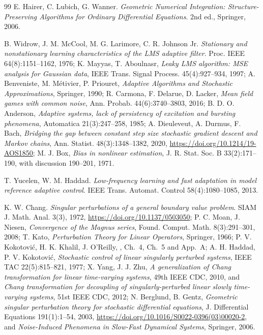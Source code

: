 \begin{thebibliography}{99}
E. Hairer, C. Lubich, G. Wanner.
\emph{Geometric Numerical Integration: Structure-Preserving Algorithms for Ordinary Differential Equations}.
2nd ed., Springer, 2006.

B. Widrow, J. M. McCool, M. G. Larimore, C. R. Johnson Jr.
\emph{Stationary and nonstationary learning characteristics of the LMS adaptive filter}.
Proc. IEEE 64(8):1151--1162, 1976;
K. Mayyas, T. Aboulnasr, \emph{Leaky LMS algorithm: MSE analysis for Gaussian data}, IEEE Trans. Signal Process.
45(4):927--934, 1997;
A. Benveniste, M. M\'etivier, P. Priouret, \emph{Adaptive Algorithms and Stochastic Approximations}, Springer, 1990;
R. Carmona, F. Delarue, D. Lacker, \emph{Mean field games with common noise}, Ann. Probab. 44(6):3740--3803, 2016;
B. D. O. Anderson, \emph{Adaptive systems, lack of persistency of excitation and bursting phenomena}, Automatica
21(3):247--258, 1985;
A. Dieuleveut, A. Durmus, F. Bach, \emph{Bridging the gap between constant step size stochastic gradient descent and
Markov chains}, Ann. Statist. 48(3):1348--1382, 2020, \url{https://doi.org/10.1214/19-AOS1850};
M. J. Box, \emph{Bias in nonlinear estimation}, J. R. Stat. Soc. B 33(2):171--190, with discussion 190--201, 1971.

T. Yucelen, W. M. Haddad.
\emph{Low-frequency learning and fast adaptation in model reference adaptive control}.
IEEE Trans. Automat. Control 58(4):1080--1085, 2013.

K. W. Chang.
\emph{Singular perturbations of a general boundary value problem}.
SIAM J. Math. Anal. 3(3), 1972, \url{https://doi.org/10.1137/0503050};
P. C. Moan, J. Niesen, \emph{Convergence of the Magnus series}, Found. Comput. Math. 8(3):291--301, 2008;
T. Kato, \emph{Perturbation Theory for Linear Operators}, Springer, 1966;
P. V. Kokotovi\'c, H. K. Khalil, J. O'Reilly, \cite{kko1986}, Ch.~4, Ch.~5 and App.~A;
A. H. Haddad, P. V. Kokotovi\'c, \emph{Stochastic control of linear singularly perturbed systems}, IEEE TAC
22(5):815--821, 1977;
X. Yang, J. J. Zhu, \emph{A generalization of Chang transformation for linear time-varying systems}, 49th IEEE CDC,
2010, and \emph{Chang transformation for decoupling of singularly-perturbed linear slowly time-varying systems}, 51st
IEEE CDC, 2012;
N. Berglund, B. Gentz, \emph{Geometric singular perturbation theory for stochastic differential equations},
J. Differential Equations 191(1):1--54, 2003, \url{https://doi.org/10.1016/S0022-0396(03)00020-2}, and
\emph{Noise-Induced Phenomena in Slow-Fast Dynamical Systems}, Springer, 2006.


\end{thebibliography}

